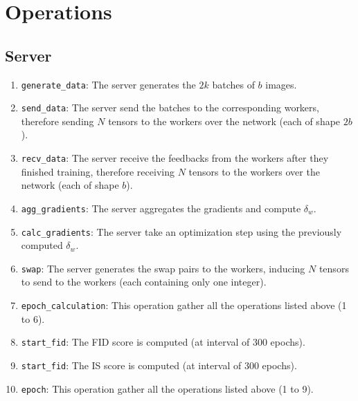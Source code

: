 \chapter{Operations}
\section{Server}
\begin{enumerate}
    \item \texttt{generate\_data}: The server generates the $2k$ batches of $b$ images.
    \item \texttt{send\_data}: The server send the batches to the corresponding workers, therefore sending $N$ tensors to the workers over the network (each of shape $2b$).
    \item \texttt{recv\_data}: The server receive the feedbacks from the workers after they finished training, therefore receiving $N$ tensors to the workers over the network (each of shape $b$).
    \item \texttt{agg\_gradients}: The server aggregates the gradients and compute $\delta_w$.
    \item \texttt{calc\_gradients}: The server take an optimization step using the previously computed $\delta_w$.
    \item \texttt{swap}: The server generates the swap pairs to the workers, inducing $N$ tensors to send to the workers (each containing only one integer).
    \item \texttt{epoch\_calculation}: This operation gather all the operations listed above (1 to 6).
    \item \texttt{start\_fid}: The FID score is computed (at interval of 300 epochs).
    \item \texttt{start\_fid}: The IS score is computed (at interval of 300 epochs).
    \item \texttt{epoch}: This operation gather all the operations listed above (1 to 9).
\end{enumerate}

